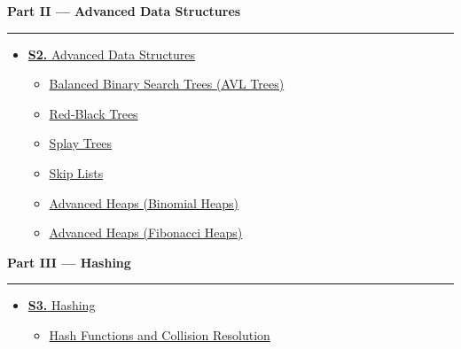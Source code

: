 \documentclass[12pt]{article}
\begin{document}
\begin{tcolorbox}[breakable,colback=cB!5,colframe=cB,boxrule=1pt,arc=5pt,
  left=8pt,right=8pt,top=8pt,bottom=8pt,before skip=4pt]
  {\large\bfseries\textcolor{cB}{Part II --- Advanced Data Structures}}\par\smallskip
  \noindent\textcolor{cB!40}{\rule{\textwidth}{0.4pt}}\par\smallskip
  \small\begin{itemize}[leftmargin=1.2em,itemsep=1pt,label={\textcolor{cB}{$\triangleright$}}]
    \item \hyperref[sec:S2]{\textbf{S2.} Advanced Data Structures}
      \begin{itemize}[leftmargin=1.5em,itemsep=0pt,label={\textcolor{cB}{$\cdot$}}]
        \item \hyperref[sub:s2-avl]{Balanced Binary Search Trees (AVL Trees)}
        \item \hyperref[sub:s2-rbt]{Red-Black Trees}
        \item \hyperref[sub:s2-splay]{Splay Trees}
        \item \hyperref[sub:s2-skip]{Skip Lists}
        \item \hyperref[sub:s2-binheap]{Advanced Heaps (Binomial Heaps)}
        \item \hyperref[sub:s2-fibheap]{Advanced Heaps (Fibonacci Heaps)}
      \end{itemize}
  \end{itemize}
\end{tcolorbox}

\begin{tcolorbox}[breakable,colback=cC!5,colframe=cC,boxrule=1pt,arc=5pt,
  left=8pt,right=8pt,top=8pt,bottom=8pt,before skip=4pt]
  {\large\bfseries\textcolor{cC}{Part III --- Hashing}}\par\smallskip
  \noindent\textcolor{cC!40}{\rule{\textwidth}{0.4pt}}\par\smallskip
  \small\begin{itemize}[leftmargin=1.2em,itemsep=1pt,label={\textcolor{cC}{$\triangleright$}}]
    \item \hyperref[sec:S3]{\textbf{S3.} Hashing}
      \begin{itemize}[leftmargin=1.5em,itemsep=0pt,label={\textcolor{cC}{$\cdot$}}]
        \item \hyperref[sub:s3-hash]{Hash Functions and Collision Resolution}
      \end{itemize}
  \end{itemize}
\end{tcolorbox}
\end{document}
